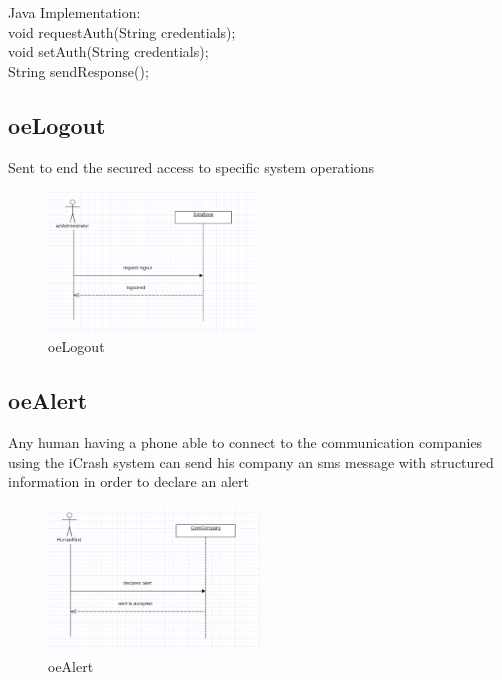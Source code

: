 \noindent Java Implementation:\\
void requestAuth(String credentials);\\
void setAuth(String credentials);\\
String sendResponse();\\

\subsection{oeLogout}
Sent to end the secured access to specific system operations

\begin{figure}[H]
\begin{center}
\includegraphics[width=0.5\textwidth]{./images/oeLogout.eps} 
\end{center}
\caption{oeLogout}
\end{figure}

\subsection{oeAlert}
Any human having a phone able to connect to the communication companies using
the iCrash system can send his company an sms message with structured
information in order to declare an alert

\begin{figure}[H]
\begin{center}
\includegraphics[width=0.5\textwidth]{./images/oeAlert.eps} 
\end{center}
\caption{oeAlert}
\end{figure}

